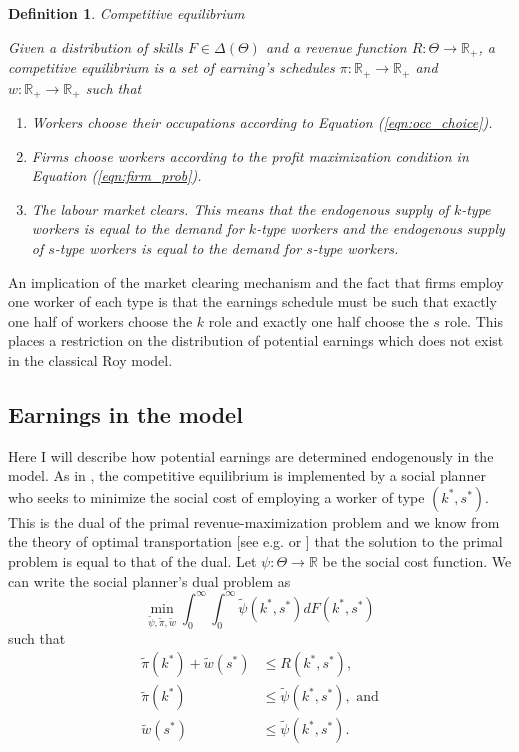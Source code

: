 \documentclass[12 pt]{article}
\newtheorem{definition}{Definition} %
\begin{document}
\begin{definition}{Competitive equilibrium}
	
	
 Given a distribution of skills $F\in \Delta(\Theta)$ and a revenue function $R: \Theta \to \mathbb{R}_+$, a competitive equilibrium is a set of earning's schedules $\pi : \mathbb{R}_+ \to \mathbb{R}_+$ and $w:\mathbb{R}_+ \to \mathbb{R}_+$ such that
 \begin{enumerate}
 	\item Workers choose their occupations according to Equation (\ref{eqn:occ_choice}).
 	\item Firms choose workers according to the profit maximization condition in Equation (\ref{eqn:firm_prob}).
 	\item The labour market clears. This means that the endogenous supply of $k$-type workers is equal to the demand for $k$-type workers and the endogenous supply of $s$-type workers is equal to the demand for $s$-type workers.
 \end{enumerate}
\end{definition}
An implication of the market clearing mechanism and the fact that firms employ one worker of each type is that the earnings schedule must be such that exactly one half of workers choose the $k$ role and exactly one half choose the $s$ role. This places a restriction on the distribution of potential earnings which does not exist in the classical Roy model. 

\subsection{Earnings in the model}

Here I will describe how potential earnings are determined endogenously in the model. As in \citet{mak2025occupational}, the competitive equilibrium is implemented by a social planner who seeks to minimize the social cost of employing a worker of type $(k^*,s^*)$. This is the dual of the primal revenue-maximization problem and we know from the theory of optimal transportation [see e.g. \citet{mccann2010optimal} or \citet{galichon2018optimal}] that the solution to the primal problem is equal to that of the dual. Let $\psi:\Theta \to \mathbb{R}$ be the social cost function. We can write the social planner's dual problem as
\begin{equation*}
	\min_{\tilde{\psi},\tilde{\pi},\tilde{w}} \int_0^\infty \int_0^\infty \tilde{\psi}(k^*,s^*) dF(k^*,s^*)
\end{equation*}
such that
\begin{align*}
	\tilde{\pi}(k^*) + \tilde{w}(s^*) &\leq R(k^*,s^*),\\
	\tilde{\pi}(k^*) &\leq \tilde{\psi}(k^*,s^*), \text{ and}\\
   \tilde{w}(s^*) &\leq\tilde{\psi}(k^*,s^*).
\end{align*}
\end{document}
